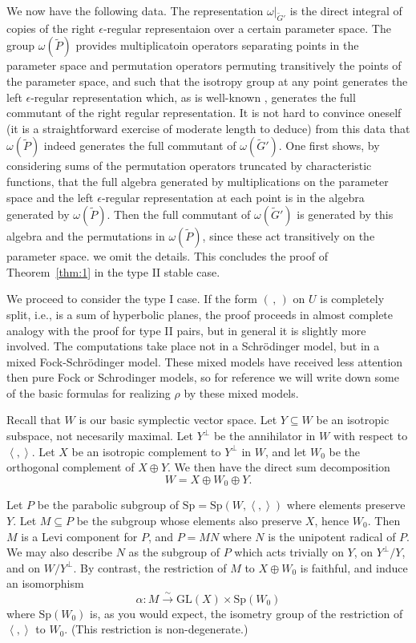 \documentclass[12pt]{amsart}
\def\inn#1#2{\left\langle{#1},{#2}\right\rangle}
\def\Sp{{\mathrm{Sp}}}
\def\GL{{\mathrm{GL}}}
\def\tP{{\widetilde{P}}}
\def\tG{{\widetilde{G}}}
\begin{document}
We now have the following data. 
The representation $\omega|_{\tG'}$ is the direct integral of 
copies of the right $\epsilon$-regular representaion over a 
certain parameter space. The group $\omega(\tP)$ provides multiplicatoin 
operators separating points in the parameter space and 
permutation operators permuting transitively the points of the parameter space, 
and such that the isotropy group at any point generates the 
left $\epsilon$-regular representation which, 
as is well-known \cite{Dixmier1982}, generates the full commutant of
the right regular representation. It is not hard to convince oneself
(it is a straightforward exercise of moderate length to deduce) 
from this data that $\omega(\tP)$ indeed generates the full commutant of 
$\omega(\tG')$. One first shows, by considering sums of the permutation 
operators truncated by characteristic functions,
that the full algebra generated by multiplications on 
the parameter space and the left $\epsilon$-regular representation 
at each point is in the algebra generated by $\omega(\tP)$. Then
the full commutant of $\omega(\tG')$ is generated by this algebra 
and the permutations in $\omega(\tP)$, since these act 
transitively on the parameter space. we omit the details. 
This concludes the proof of Theorem~\ref{thm:1} in the type II stable case.


We proceed to consider the type I case. If the form $(\,,\,)$ on $U$ 
is completely split, i.e., is a sum of hyperbolic planes, 
the proof proceeds in almost complete analogy with the proof for 
type II pairs, but in general it is slightly more involved. 
The computations take place not in a Schr\"odinger model, 
but in a mixed Fock-Schr\"odinger model.
These mixed models have received less attention then pure 
Fock or Schrodinger models, so for reference we will write down some
of the basic formulas for realizing $\rho$ by these mixed models.

Recall that $W$ is our basic symplectic vector space. Let $Y\subseteq W$
be an isotropic subspace, not necesarily maximal. 
Let $Y^\perp$ be the annihilator in $W$ with respect to 
$\inn{ }{ }$. Let $X$ be an isotropic complement to $Y^\perp$ in $W$, 
and let $W_0$ be the orthogonal complement of $X\oplus Y$.
We then have the direct sum decomposition
\begin{equation}\label{eq:11}
W = X\oplus W_0\oplus Y.
\end{equation}

Let $P$ be the parabolic subgroup of $\Sp = \Sp(W,\inn{}{})$ 
where elements preserve $Y$. 
Let $M\subseteq P$ be the subgroup whose elements also preserve $X$,
hence $W_0$.  Then $M$ is a Levi component for $P$, 
and $P=MN$ where $N$ is the unipotent radical of $P$. 
We may also describe $N$ as the subgroup of $P$ which acts 
trivially on $Y$, on $Y^\perp/Y$, and on $W/Y^\perp$.
By contrast, the restriction of $M$ to $X\oplus W_0$ is faithful, 
and induce an isomorphism 
\begin{equation}\label{eq:12}
\alpha: M\stackrel{\sim}{\to} \GL(X)\times \Sp(W_0)
\end{equation}
where $\Sp(W_0)$ is, as you would expect, the isometry group of 
the restriction of $\inn{}{}$ to $W_0$. (This restriction is non-degenerate.)
\end{document}
